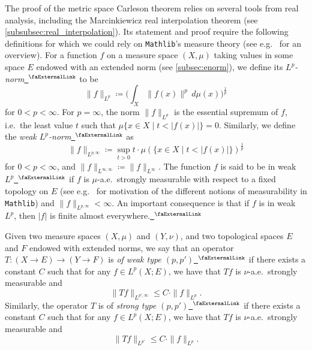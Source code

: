 \documentclass[12pt]{amsart}
\newcommand{\mathlib}{\texttt{Mathlib}\xspace}
\newcommand{\extlink}{~\ensuremath{{}^\text{\faExternalLink}}}
\theoremstyle{definition}
\theoremstyle{plain}
\begin{document}
The proof of the metric space Carleson theorem relies on several tools from real analysis, including the Marcinkiewicz real interpolation theorem (see \ref{subsubsec:real_interpolation}). Its statement and proof require the following definitions for which we could rely on \mathlib's measure theory (see e.g.\ \cite{vanDoornFormalizedHaarMeasure} for an overview).
For a function $f$ on a measure space $(X,\mu)$ taking values in some space $E$ endowed with an extended norm (see \ref{subsec:enorm}), we define its \emph{$L^p$-norm}\href{https://github.com/leanprover-community/mathlib4/blob/81a5d257c8e410db227a6665ed08f64fea08e997/Mathlib/MeasureTheory/Function/LpSeminorm/Defs.lean#L83-L87}{\extlink} to be
\begin{equation*}
  \|f\|_{L^{p}} \coloneq \big(\int_X\|f(x)\|^p\, d\mu(x)\big) ^ \frac{1}{p}
\end{equation*}
for $0<p<\infty$. For $p=\infty$, the norm $\|f\|_{L^{p}}$ is the essential supremum of $f$, i.e.\ the least value $t$ such that
$\mu\{x\in X \mid t < |f(x)| \}=0$. Similarly, we define the \emph{weak $L^p$-norm}\href{https://github.com/fpvandoorn/carleson/blob/020d6e5c71d731952eb0379d222eea4049103ca0/Carleson/ToMathlib/WeakType.lean#L37}{\extlink} as
\begin{equation*}
  \|f\|_{L^{p,\infty}} \coloneq \sup_{t>0} t \cdot \mu (\{x\in X \mid t < |f(x)| \}) ^ \frac{1}{p}
\end{equation*}
for $0<p<\infty$, and $\|f\|_{L^{\infty,\infty}} \coloneq \|f\|_{L^{\infty}}$.
The function $f$ is said to be in weak $L^p$\href{https://github.com/fpvandoorn/carleson/blob/020d6e5c71d731952eb0379d222eea4049103ca0/Carleson/ToMathlib/WeakType.lean#L285}{\extlink} if $f$ is $\mu$-a.e.\ strongly measurable with respect to a fixed topology on $E$ (see e.g.\ \cite{GouezelChangeOfVariables} for motivation of the different notions of measurability in \mathlib) and $\|f\|_{L^{p,\infty}} < \infty$.
An important consequence is that if $f$ is in weak $L^p$, then $|f|$ is finite almost everywhere.\href{https://github.com/fpvandoorn/carleson/blob/020d6e5c71d731952eb0379d222eea4049103ca0/Carleson/ToMathlib/WeakType.lean#L302}{\extlink}

Given two measure spaces $(X,\mu)$ and $(Y,\nu)$, and two topological spaces $E$ and $F$ endowed with extended norms, we say that an operator $T\colon (X \to E) \to (Y \to F)$ is \emph{of weak type $(p,p')$}\href{https://github.com/fpvandoorn/carleson/blob/020d6e5c71d731952eb0379d222eea4049103ca0/Carleson/ToMathlib/WeakType.lean#L419}{\extlink} if there exists a constant $C$ such that for any $f\in L^p(X; E)$, we have that $T f$ is $\nu$-a.e.\ strongly measurable and
\begin{equation}
  \|T f\|_{L^{p',\infty}} \le C \cdot \|f\|_{L^p}.
\end{equation}
Similarly, the operator $T$ is of \emph{strong type $(p, p')$}\href{https://github.com/fpvandoorn/carleson/blob/020d6e5c71d731952eb0379d222eea4049103ca0/Carleson/ToMathlib/WeakType.lean#L433}{\extlink} if there exists a constant $C$ such that for any $f\in L^p(X; E)$, we have that $T f$ is $\nu$-a.e.\ strongly measurable and
\begin{equation}
  \|T f\|_{L^{p'}} \le C \cdot \|f\|_{L^p}.
\end{equation}
\end{document}
